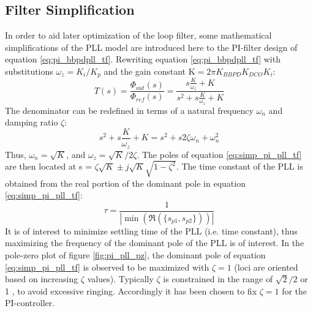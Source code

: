 \subsection{Filter Simplification}\label{sec:filter_simplification}
			 In order to aid later optimization of the loop filter, some mathematical simplifications of the PLL model are introduced here to the PI-filter design of equation \ref{eq:pi_bbpdpll_tf}. Rewriting equation \ref{eq:pi_bbpdpll_tf} with substitutions $\omega_z = K_i/K_p$ and the gain constant $\mathrm{K} = 2\pi K_{BBPD}K_{DCO}K_{i}$:
			\begin{equation} \label{eq:simp_pi_pll_tf}
				T(s) = \frac{\Phi_{out}(s)}{\Phi_{ref}(s)} = \frac{s\frac{K}{\omega_z} + K }{s^2 + s\frac{K}{\omega_z} + K}
			\end{equation}
			The denominator can be redefined in terms of a natural frequency $\omega_n$ and damping ratio $\zeta$:
			\begin{equation}
				s^2 + s\frac{K}{\omega_z} + K = s^2 + s2\zeta\omega_n + \omega_n^2
			\end{equation}
			Thus, $\omega_n = \sqrt{K}$, and $\omega_z = \sqrt{K}/2\zeta$. The poles of equation \ref{eq:simp_pi_pll_tf} are then located at s = $\zeta\sqrt{K} \pm j\sqrt{K}\sqrt{1-\zeta^2}$. The time constant of the PLL is obtained from the real portion of the dominant pole in equation \ref{eq:simp_pi_pll_tf}:
			\begin{equation}
				\tau = \frac{1}{|\min(\Re(\{s_{p1}, s_{p2}\}))|}
			\end{equation}
			 It is of interest to minimize settling time of the PLL (i.e. time constant), thus maximizing the frequency of the dominant pole of the PLL is of interest. In the pole-zero plot of figure \ref{fig:pi_pll_pz}, the dominant pole of equation \ref{eq:simp_pi_pll_tf} is observed to be maximized with $\zeta=1$ (loci are oriented based on increasing $\zeta$ values). Typically $\zeta$ is constrained in the range of $\sqrt{2}/2$ or 1 \cite{razavi_2017}, to avoid excessive ringing. Accordingly it has been chosen to fix $\zeta=1$ for the PI-controller.

